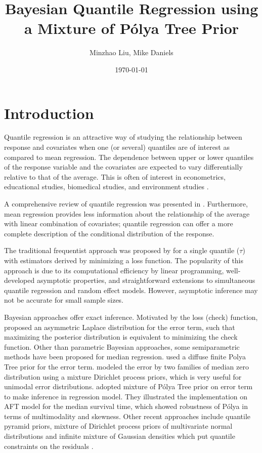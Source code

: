 \documentclass[12pt]{article}
\title{Bayesian Quantile Regression using a  Mixture of P\'{o}lya Tree Prior}
\date{\today}
\author{Minzhao Liu, Mike Daniels}
\newcommand{\polya}{P\'{o}lya}
\begin{document}

\maketitle{}

\section{Introduction}

Quantile regression is an attractive way of studying the relationship
between response and covariates when one (or several) quantiles are of
interest as compared to mean regression.  The dependence between upper
or lower quantiles of the response variable and the covariates are
expected to vary differentially relative to that of the average. This
is often of interest in econometrics, educational studies, biomedical
studies, and environment studies \citep{yu2001,buchinsky1994,
  buchinsky1998,he1998,koenker1999, wei2006, yu2003}.

A comprehensive review of quantile regression was presented in
\citep{koenker2005}.  Furthermore, mean regression provides less
information about the relationship of the average with linear
combination of covariates; quantile regression can offer a more
complete description of the conditional distribution of the response.

The traditional frequentist approach was proposed by
\citep{koenker1978} for a single quantile ($\tau$) with estimators
derived by minimizing a loss function. The popularity of this approach
is due to its computational efficiency by linear programming,
well-developed asymptotic properties, and straightforward extensions
to simultaneous quantile regression and random effect models. However,
asymptotic inference may not be accurate for small sample sizes.

Bayesian approaches offer exact inference. Motivated by the loss
(check) function, \citep{yu2001} proposed an asymmetric Laplace
distribution for the error term, such that maximizing the posterior
distribution is equivalent to minimizing the check function. Other
than parametric Bayesian approaches, some semiparametric methods have
been proposed for median regression. \citep{walker1999} used a diffuse
finite Polya Tree prior for the error term. \citep{kottas2001} modeled
the error by two families of median zero distribution using a mixture
Dirichlet process priors, which is very useful for unimodal error
distributions. \citep{hanson2002} adopted mixture of \polya{} Tree
prior on error term to make inference in regression model. They
illustrated the implementation on AFT model for the median survival
time, which showed robustness of \polya{} in terms of multimodality
and skewness. Other recent approaches include quantile pyramid priors,
mixture of Dirichlet process priors of multivariate normal
distributions and infinite mixture of Gaussian densities which put
quantile constraints on the residuals \citep{hjort2007,hjort2009,
  kottas2009, reich2010}.
\end{document}

